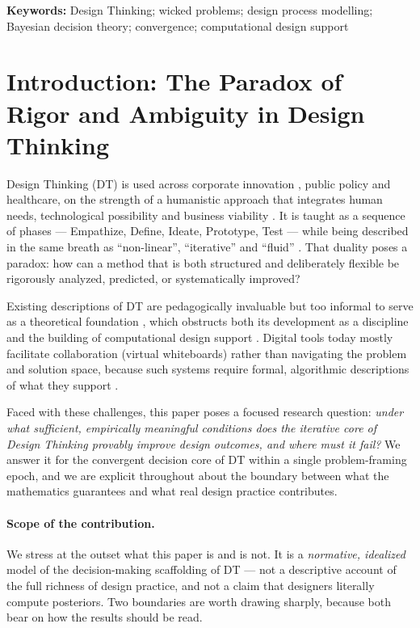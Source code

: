 \documentclass[11pt]{article}
\begin{document}
\vspace{0.5em}
\noindent\textbf{Keywords:} Design Thinking; wicked problems; design process modelling; Bayesian decision theory; convergence; computational design support

\section{Introduction: The Paradox of Rigor and Ambiguity in Design Thinking}

Design Thinking (DT) is used across corporate innovation \citep{simon1996, brown2008}, public policy \citep{rittel1973} and healthcare, on the strength of a humanistic approach that integrates human needs, technological possibility and business viability \citep{plattner2011}. It is taught as a sequence of phases --- Empathize, Define, Ideate, Prototype, Test --- while being described in the same breath as ``non-linear'', ``iterative'' and ``fluid'' \citep{brown2008, uebernickel2020}. That duality poses a paradox: how can a method that is both structured and deliberately flexible be rigorously analyzed, predicted, or systematically improved?

Existing descriptions of DT are pedagogically invaluable but too informal to serve as a theoretical foundation \citep{liedtka2018, uebernickel2020}, which obstructs both its development as a discipline and the building of computational design support \citep{broberg2023}. Digital tools today mostly facilitate collaboration (virtual whiteboards) rather than navigating the problem and solution space, because such systems require formal, algorithmic descriptions of what they support \citep{fillingim2022, hermsen2015, majka2024}.

Faced with these challenges, this paper poses a focused research question: \emph{under what sufficient, empirically meaningful conditions does the iterative core of Design Thinking provably improve design outcomes, and where must it fail?} We answer it for the convergent decision core of DT within a single problem-framing epoch, and we are explicit throughout about the boundary between what the mathematics guarantees and what real design practice contributes.

\paragraph{Scope of the contribution.}
We stress at the outset what this paper is and is not. It is a \emph{normative, idealized} model of the decision-making scaffolding of DT --- not a descriptive account of the full richness of design practice, and not a claim that designers literally compute posteriors. Two boundaries are worth drawing sharply, because both bear on how the results should be read.
\end{document}
